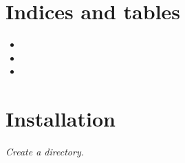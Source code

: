 \documentclass[letterpaper,10pt,english]{sphinxmanual}
\begin{document}
\chapter{Indices and tables}
\label{index:indices-and-tables}\begin{itemize}
\item {} 

\item {} 

\item {} 

\end{itemize}


\chapter{Installation}
\label{index:installation}
\emph{Create a directory.}



\renewcommand{\indexname}{Index}
\printindex
\end{document}

